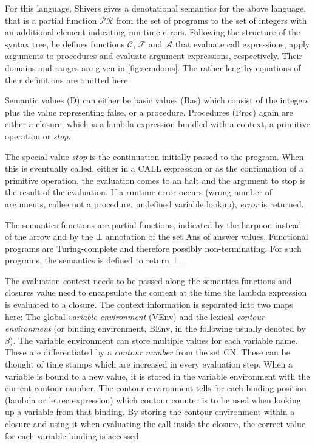 \documentclass[a4paper,halfparskip,DIV=10,11pt]{scrbook}
\newcommand{\C}{\mathcal C}
\newcommand{\F}{\mathcal F}
\newcommand{\PR}{\mathcal {PR}}
\newcommand{\A}{\mathcal A}
\begin{document}
For this language, Shivers gives a denotational semantics for the above language, that is a partial function $\PR$ from the set of programs to the set of integers with an additional element indicating run-time errors. Following the structure of the syntax tree, he defines functions $\C$, $\F$ and $\A$ that evaluate call expressions, apply arguments to procedures and evaluate argument expressions, respectively. Their domains and ranges are given in \vref{fig:semdoms}. The rather lengthy equations of their definitions are omitted here.

Semantic values (D) can either be basic values (Bas) which consist of the integers plus the value representing false, or a procedure. Procedures (Proc) again are either a closure, which is a lambda expression bundled with a context, a primitive operation or \textit{stop}.

The special value \textit{stop} is the continuation initially passed to the program. When this is eventually called, either in a CALL expression or as the continuation of a primitive operation, the evaluation comes to an halt and the argument to stop is the result of the evaluation. If a runtime error occurs (wrong number of arguments, callee not a procedure, undefined variable lookup), \textit{error} is returned.

The semantics functions are partial functions, indicated by the harpoon instead of the arrow and by the $\bot$ annotation of the set Ans of answer values. Functional programs are Turing-complete and therefore possibly non-terminating. For such programs, the semantics is defined to return $\bot$.

The evaluation context needs to be passed along the semantics functions and closures value need to encapsulate the context at the time the lambda expression is evaluated to a closure. The context information is separated into two maps here: The global \textit{variable environment} (VEnv) and the lexical \textit{contour environment} (or binding environment, BEnv, in the following usually denoted by $\beta$). The variable environment can store multiple values for each variable name. These are differentiated by a \textit{contour number} from the set CN. These can be thought of time stamps which are increased in every evaluation step. When a variable is bound to a new value, it is stored in the variable environment with the current contour number. The contour environment tells for each binding position (lambda or letrec expression) which contour counter is to be used when looking up a variable from that binding. By storing the contour environment within a closure and using it when evaluating the call inside the closure, the correct value for each variable binding is accessed.
\end{document}
